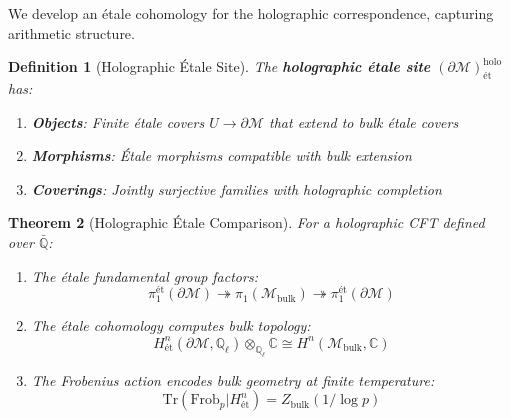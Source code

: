 \documentclass[12pt,a4paper]{article}
\newtheorem{theorem}{Theorem}[section]
\newtheorem{definition}[theorem]{Definition}
\begin{document}
We develop an \'etale cohomology for the holographic correspondence, capturing arithmetic structure.

\begin{definition}[Holographic \'Etale Site]\label{def:holo-etale}
The \textbf{holographic \'etale site} $(\partial\mathcal{M})_{\text{\'et}}^{\text{holo}}$ has:
\begin{enumerate}
    \item \textbf{Objects}: Finite \'etale covers $U \to \partial\mathcal{M}$ that extend to bulk \'etale covers
    \item \textbf{Morphisms}: \'Etale morphisms compatible with bulk extension
    \item \textbf{Coverings}: Jointly surjective families with holographic completion
\end{enumerate}
\end{definition}

\begin{theorem}[Holographic \'Etale Comparison]\label{thm:holo-etale}
For a holographic CFT defined over $\bar{\mathbb{Q}}$:
\begin{enumerate}
    \item The \'etale fundamental group factors:
    \begin{equation}
    \pi_1^{\text{\'et}}(\partial\mathcal{M}) \twoheadrightarrow \pi_1(\mathcal{M}_{\text{bulk}}) \twoheadrightarrow \pi_1^{\text{\'et}}(\partial\mathcal{M})
    \end{equation}
    
    \item The \'etale cohomology computes bulk topology:
    \begin{equation}
    H^n_{\text{\'et}}(\partial\mathcal{M}, \mathbb{Q}_\ell) \otimes_{\mathbb{Q}_\ell} \mathbb{C} \cong H^n(\mathcal{M}_{\text{bulk}}, \mathbb{C})
    \end{equation}
    
    \item The Frobenius action encodes bulk geometry at finite temperature:
    \begin{equation}
    \text{Tr}(\text{Frob}_p | H^n_{\text{\'et}}) = Z_{\text{bulk}}(1/\log p)
    \end{equation}
\end{enumerate}
\end{theorem}
\end{document}
